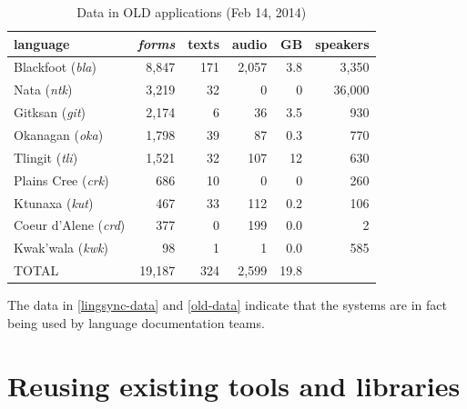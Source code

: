 \documentclass[11pt]{article}
\begin{document}
\begin{table}[h]
 \begin{center}
     \scriptsize
\begin{tabular}{lrrrrr}

      \toprule
      language &                     \emph{forms}  & texts & audio & GB   & speakers \\
      \midrule
      Blackfoot (\textit{bla}) &     8,847  & 171   & 2,057 & 3.8  & 3,350    \\ %
      Nata (\textit{ntk}) &          3,219  & 32    & 0     & 0    & 36,000   \\ %
      Gitksan (\textit{git}) &       2,174  & 6     & 36    & 3.5  & 930      \\ %
      Okanagan (\textit{oka}) &      1,798  & 39    & 87    & 0.3  & 770      \\ %
      Tlingit (\textit{tli}) &       1,521  & 32    & 107   & 12   & 630      \\ %
      Plains Cree (\textit{crk}) &   686    & 10    & 0     & 0    & 260      \\ %
      Ktunaxa (\textit{kut}) &       467    & 33    & 112   & 0.2  & 106      \\ %
      Coeur d'Alene (\textit{crd}) & 377    & 0     & 199   & 0.0  & 2        \\ %
      Kwak'wala (\textit{kwk}) &     98     & 1     & 1     & 0.0  & 585      \\ %
      TOTAL &                        19,187 & 324   & 2,599 & 19.8 &         \\ %
      \bottomrule

\end{tabular}
\caption{Data in OLD applications (Feb 14, 2014)}
\label{old-data}
 \end{center}
 \normalsize
\end{table}

The data in \autoref{lingsync-data} and \autoref{old-data} indicate that the
systems are in fact being used by language documentation teams. 



\section{Reusing existing tools and libraries}
\label{sec:plugins}
\end{document}
